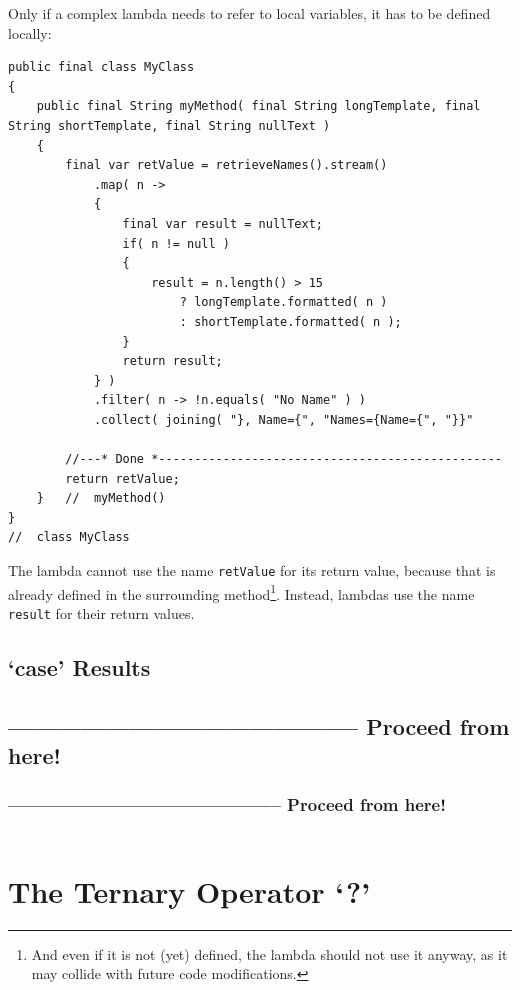 \documentclass[11pt,a4paper, titlepage, parskip=half, headsepline, footsepline, cleardoublepage=current, headheight=1cm]{scrbook}
\begin{document}
Only if a complex lambda needs to refer to local variables, it has to be defined locally:
\begin{lstlisting}
public final class MyClass
{
    public final String myMethod( final String longTemplate, final String shortTemplate, final String nullText )
    {
        final var retValue = retrieveNames().stream()
            .map( n ->
            {
                final var result = nullText;
                if( n != null )
                {
                    result = n.length() > 15 
                        ? longTemplate.formatted( n ) 
                        : shortTemplate.formatted( n );
                }
                return result;
            } )
            .filter( n -> !n.equals( "No Name" ) )
            .collect( joining( "}, Name={", "Names={Name={", "}}"
        
        //---* Done *------------------------------------------------
        return retValue;
    }   //  myMethod()
}
//  class MyClass
\end{lstlisting}
The lambda cannot use the name \lstinline|retValue| for its return value, because that is already defined in the surrounding method\footnote{And even if it is not (yet) defined, the lambda should not use it anyway, as it may collide with future code modifications.}. Instead, lambdas use the name \lstinline|result| for their return values.

\subsection{‘case’ Results}\label{sec:CaseResults}
\subsection{-------------------------------------------- Proceed from here!}
\subsubsection{-------------------------------------------- Proceed from here!}
\autocite{ORACLE_DOC_SWITCHEXPRESSIONS}
\autocite{}
\autocite{}
\autocite{}
\autocite{}
\autocite{}
\autocite{}
\autocite{}
\autocite{}
\lipsum[5]

\begin{lstlisting}
\end{lstlisting}

\section{The Ternary Operator ‘?’}\label{sec:TheTernaryOperator}
\end{document}
